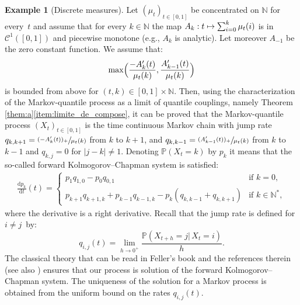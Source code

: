 \documentclass[JEP,XML,SOM,Unicode,NoEqCountersInSection,NoFloatCountersInSection,published]{cedram}
\newcommand\mto{\mathchoice{\longmapsto}{\mapsto}{\mapsto}{\mapsto}}
\theoremstyle{plain}
\theoremstyle{definition}
\newtheorem{ex}[them]{Example}
\newcommand{\dd}{\mathrm{d}}
\renewcommand{\P}{\mathbb{P}}
\newcommand{\N}{\mathbb{N}}
\begin{document}
\begin{ex}[Discrete measures]\label{ex:integers}
Let $(\mu_t)_{t\in [0,1]}$ be concentrated on $\N$ for every~$t$ and assume that for every $k\in \N$ the map $A_k:t\mto \sum_{i=0}^k \mu_t(i)$ is in $\mathcal{C}^1([0,1])$ and piecewise monotone (e.g., $A_k$ is analytic). Let moreover $A_{-1}$ be the zero constant function. We assume that:\vspace*{-3pt}\enlargethispage{.3\baselineskip}%
\[\max\Bigl(\frac{-A'_k(t)}{\mu_t(k)},\frac{A'_{k-1}(t)}{\mu_t(k)}\Bigr)\]
is bounded from above for $(t,k)\in[0,1]\times \mathbb{N}$. Then, using the characterization of the Markov-quantile process as a limit of quantile couplings, namely Theorem \ref{them:a}\eqref{item:limite_de_compose}, it can be proved that the Markov-quantile process $(X_t)_{t\in [0,1]}$ is the time continuous Markov chain with jump rate $q_{k,k+1}=\sfrac{(-A'_k(t))_+}{\mu_t(k)}$ from $k$ to $k+1$, and $q_{k,k-1}=\sfrac{(A'_{k-1}(t))_+}{\mu_t(k)}$ from $k$ to $k-1$ and $q_{k,j}=0$ for $|j-k|\neq 1$. Denoting $\P(X_t=k)$ by $p_k$ it means that the so-called forward Kolmogorov--Chapman system is satisfied:\vspace*{-3pt}
\begin{align*}
\frac{\dd p_k}{\dd t}(t)=
\begin{cases}
p_{1}q_{1,0}-p_0q_{0,1}&\text{if }k=0,\\
p_{k+1}q_{k+1,k}+p_{k-1}q_{k-1,k}-p_k(q_{k,k-1}+q_{k,k+1})&\text{if }k\in \N^*,
\end{cases}
\end{align*}
where the derivative is a right derivative. Recall that the jump rate is defined for $i\neq j$~by:\vspace*{-3pt}
\[
q_{i,j}(t)=\lim_{h\to 0^+}\frac{\P(X_{t+h}=j|\,X_t=i)}{h}.
\]
The classical theory that can be read in Feller's book \cite[Chap.\,XVII, \S 9]{Fe_t1} and the references therein (see also \cite{Doe}) ensures that our process is solution of the forward Kolmogorov--Chapman system. The uniqueness of the solution for a Markov process is obtained from the uniform bound on the rates $q_{i,j}(t)$.


\end{ex}
\end{document}
